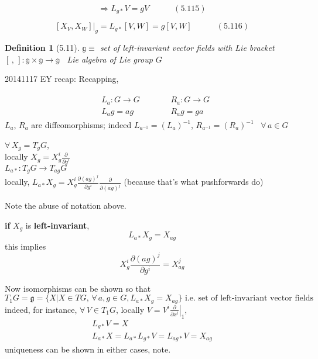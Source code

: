 \documentclass[twoside]{amsart}
\newtheorem{definition}{Definition}
\begin{document}
\begin{equation}
  \Longrightarrow L_{g*}V = gV \quad \quad \quad (5.115) 
\end{equation}

\begin{equation}
  \left. [ X_V, X_W ] \right|_g = L_{g*}[V,W] = g[V,W] \quad \quad \quad (5.116)
\end{equation}


\begin{definition}[5.11]
  $\mathbb{g} \equiv $ set of left-invariant vector fields with Lie bracket $[ \, , \, ] : \mathbb{g} \times \mathbb{g} \to \mathbb{g}$  \quad \, Lie algebra of Lie group $G$
\end{definition}

\hrulefill

20141117 EY recap: Recapping,

\[
\begin{gathered}
  \begin{aligned}
    & L_a : G \to G \\
    & L_a g = ag \end{aligned} \quad \quad \, \begin{aligned}
    & R_a : G \to G \\ 
    & R_a g = ga \end{aligned}
\end{gathered}
\]
$L_a$, $R_a$ are diffeomorphisms; indeed $L_{a^{-1}} = (L_a)^{-1}$, $R_{a^{-1}} = (R_a)^{-1}$ \quad \, $\forall \, a \in G$

$\forall \, X_g = T_gG$, \\
locally $X_g = X_g^i \frac{ \partial }{ \partial g^i }$ \\

$L_{a*} : T_gG \to T_{ag}G$ \\
locally, $L_{a*} X_g = X^i_g \frac{ \partial (ag)^j}{ \partial g^i} \frac{ \partial}{ \partial (ag)^j}$ (because that's what pushforwards do) 

Note the abuse of notation above.

\textbf{if} $X_g$ is \textbf{left-invariant}, 
\[
L_{a*} X_g = X_{ag}
\] 
this implies
\[
X^i_g \frac{ \partial (ag)^j}{ \partial g^i} = X^j_{ag}
\]

Now isomorphisms can be shown so that
\[
T_1G = \mathfrak{g} = \lbrace X | X \in TG, \, \forall \, a,g \in G, L_{a*} X_g = X_{ag} \rbrace \text{ i.e. set of left-invariant vector fields}
\]
indeed, for instance, $\forall \, V \in T_1G$, locally $V  = V^i \left. \frac{ \partial }{ \partial x^i} \right|_1$, 
\[
\begin{gathered}
  L_{g*} V = X \\ 
  L_{a*}X = L_{a*} L_{g*} V = L_{ag*} V = X_{ag}
\end{gathered}
\]
uniqueness can be shown in either cases, note. 
\end{document}
